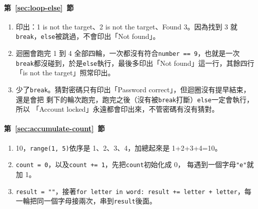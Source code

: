 \paragraph{第~\ref{sec:loop-else}~節}
\begin{enumerate}
\item 印出：1 is not the target、2 is not the target、Found 3。因為找到 3 就
\texttt{break}，\texttt{else}被跳過，不會印出「Not found」。
\item 迴圈會跑完 1 到 4 全部四輪，一次都沒有符合\texttt{number == 9}，也就是一次
\texttt{break}都沒碰到，於是\texttt{else}執行，最後多印出「Not found」這一行，其餘四行
「is not the target」照常印出。
\item 少了\texttt{break}。猜對密碼只有印出「Password correct」，但迴圈沒有提早結束，還是會把
剩下的輪次跑完，跑完之後（沒有被\texttt{break}打斷）\texttt{else}一定會執行，所以
「Account locked」永遠都會印出來，不管密碼有沒有猜對。
\end{enumerate}

\paragraph{第~\ref{sec:accumulate-count}~節}
\begin{enumerate}
\item 10，\texttt{range(1, 5)}依序是 1、2、3、4，加總起來是 1+2+3+4=10。
\item \texttt{count = 0}，以及\texttt{count += 1}，先把\texttt{count}初始化成 0，
每遇到一個字母\texttt{"e"}就加 1。
\item \texttt{result = ""}，接著\texttt{for letter in word: result += letter +
letter}，每一輪把同一個字母接兩次，串到\texttt{result}後面。
\end{enumerate}
